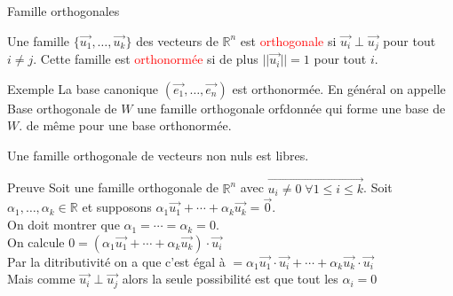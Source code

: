 \begin{parag}{Famille orthogonales}
    \begin{definition}
        Une famille $\{\vec{u_1}, \dots, \vec{u_k}\}$ des vecteurs de $\mathbb{R}^n$ est \textcolor{red}{orthogonale} si $\vec{u_i}\perp \vec{u_j}$ pour tout $i \neq j$. Cette famille est \textcolor{red}{orthonormée} si de plus $||\vec{u_i}|| = 1$ pour tout $i$.
    \end{definition}
    \begin{subparag}{Exemple}
        La base canonique $(\vec{e_1}, \dots, \vec{e_n})$ est orthonormée. En général on appelle Base orthogonale de $W$ une famille orthogonale orfdonnée qui forme une base de $W$. de même pour une base orthonormée.
    \end{subparag}
    \begin{theoreme}
        Une famille orthogonale de vecteurs non nuls est libres.
    \end{theoreme}
    \begin{subparag}{Preuve}
        Soit une famille orthogonale de $\mathbb{R}^n$ avec $\vec{u_i \neq 0 \; \forall 1 \leq i \leq k}$. Soit $\alpha_1, \dots, \alpha_k \in \mathbb{R}$ et supposons $\alpha_1 \vec{u_1} + \cdots + \alpha_k\vec{u_k} = \vec{0}$. \\
        On doit montrer que $\alpha_1 = \cdots = \alpha_k = 0$.
        \\
        On calcule $0 = (\alpha_1\vec{u_1} + \cdots + \alpha_k\vec{u_k})\cdot \vec{u_i}$\\
        Par la ditributivité on a que c'est égal à $ = \alpha_1\vec{u_1}\cdot\vec{u_i} + \cdots + \alpha_k\vec{u_k}\cdot\vec{u_i}$\\
        Mais comme $\vec{u_i}\perp\vec{u_j}$ alors la seule possibilité est que tout les $\alpha_i = 0$
        
        
    \end{subparag}
\end{parag}


